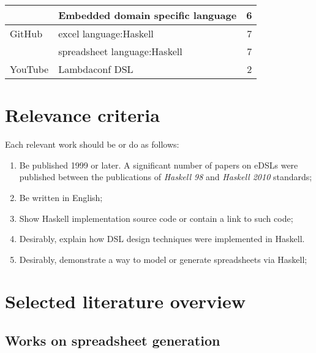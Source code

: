 \begin{longtable}{|l|l|r|}
                                   & Embedded domain specific language         &
    6                                                                                                     \\
    \hline
    GitHub
                                   & excel language:Haskell                    & 7                        \\
                                   & spreadsheet language:Haskell              & 7                        \\
    \hline
    YouTube
                                   & Lambdaconf DSL                            & 2                        \\
    \hline
\end{longtable}

\section{Relevance criteria} \label {sec:relevance}

Each relevant work should be or do as follows:

\begin{enumerate}[noitemsep, label=\arabic*) ]
    \item Be published 1999 or later. A significant number of papers on eDSLs were published between the publications of \textit{Haskell 98} and \textit{Haskell 2010} standards;
    \item Be written in English;
    \item Show Haskell implementation source code or contain a link to such code;
    \item Desirably, explain how DSL design techniques were implemented in Haskell.
    \item Desirably, demonstrate a way to model or generate spreadsheets via Haskell;
\end{enumerate}

\section{Selected literature overview} \label{sec:selectedLiterature}

\subsection{Works on spreadsheet generation}

